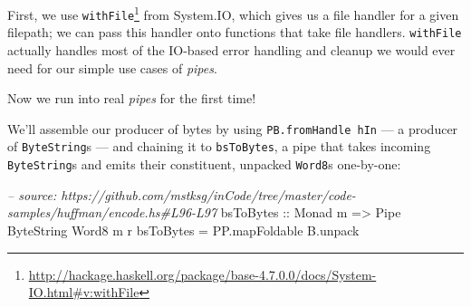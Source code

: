 \documentclass[]{article}
\newenvironment{Shaded}{}{}
\newcommand{\KeywordTok}[1]{\textcolor[rgb]{0.00,0.44,0.13}{\textbf{#1}}}
\newcommand{\DataTypeTok}[1]{\textcolor[rgb]{0.56,0.13,0.00}{#1}}
\newcommand{\DecValTok}[1]{\textcolor[rgb]{0.25,0.63,0.44}{#1}}
\newcommand{\CommentTok}[1]{\textcolor[rgb]{0.38,0.63,0.69}{\textit{#1}}}
\newcommand{\OtherTok}[1]{\textcolor[rgb]{0.00,0.44,0.13}{#1}}
\newcommand{\FunctionTok}[1]{\textcolor[rgb]{0.02,0.16,0.49}{#1}}
\newcommand{\NormalTok}[1]{#1}
\renewcommand{\href}[2]{#2\footnote{\url{#1}}}
\begin{document}
\begin{Shaded}
\end{Shaded}

First, we use
\href{http://hackage.haskell.org/package/base-4.7.0.0/docs/System-IO.html\#v:withFile}{\texttt{withFile}}
from System.IO, which gives us a file handler for a given filepath; we can pass
this handler onto functions that take file handlers. \texttt{withFile} actually
handles most of the IO-based error handling and cleanup we would ever need for
our simple use cases of \emph{pipes}.

Now we run into real \emph{pipes} for the first time!

We'll assemble our producer of bytes by using \texttt{PB.fromHandle\ hIn} --- a
producer of \texttt{ByteString}s --- and chaining it to \texttt{bsToBytes}, a
pipe that takes incoming \texttt{ByteString}s and emits their constituent,
unpacked \texttt{Word8}s one-by-one:

\begin{Shaded}
\begin{Highlighting}[]
\CommentTok{-- source: https://github.com/mstksg/inCode/tree/master/code-samples/huffman/encode.hs#L96-L97}
\OtherTok{bsToBytes ::} \DataTypeTok{Monad}\NormalTok{ m }\OtherTok{=>} \DataTypeTok{Pipe} \DataTypeTok{ByteString} \DataTypeTok{Word8}\NormalTok{ m r}
\NormalTok{bsToBytes }\FunctionTok{=}\NormalTok{ PP.mapFoldable B.unpack}
\end{Highlighting}
\end{Shaded}
\end{document}

